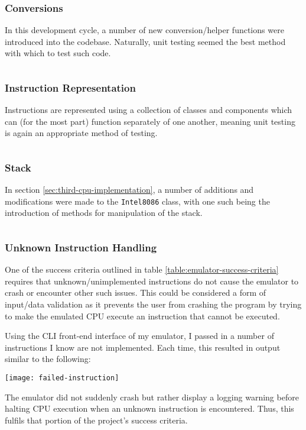     \subsubsection{Conversions}
        In this development cycle, a number of new conversion/helper functions were introduced into the codebase. Naturally, unit testing seemed the best method with which to test such code.

        \inputminted{c++}{code/third/testconversions.cpp}

    \subsubsection{Instruction Representation}
        Instructions are represented using a collection of classes and components which can (for the most part) function separately of one another, meaning unit testing is again an appropriate method of testing.

        \inputminted{c++}{code/third/testinstrrep.cpp}

    \subsubsection{Stack}
        In section \ref{sec:third-cpu-implementation}, a number of additions and modifications were made to the \texttt{Intel8086} class, with one such being the introduction of methods for manipulation of the stack.

        \inputminted{c++}{code/third/teststack.cpp}

    \subsubsection{Unknown Instruction Handling}
        One of the success criteria outlined in table \ref{table:emulator-success-criteria} requires that unknown/unimplemented instructions do not cause the emulator to crash or encounter other such issues. This could be considered a form of input/data validation as it prevents the user from crashing the program by trying to make the emulated CPU execute an instruction that cannot be executed.

        Using the CLI front-end interface of my emulator, I passed in a number of instructions I know are not implemented. Each time, this resulted in output similar to the following:

        \texttt{[image: failed-instruction]}

        The emulator did not suddenly crash but rather display a logging warning before halting CPU execution when an unknown instruction is encountered. Thus, this fulfils that portion of the project's success criteria.

